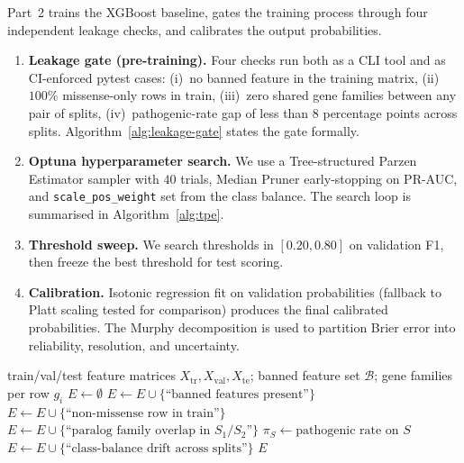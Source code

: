 \documentclass[11pt,a4paper,oneside]{report}
\begin{document}
Part~2 trains the XGBoost baseline, gates the training
process through four independent leakage checks, and
calibrates the output probabilities.

\begin{enumerate}
\item \textbf{Leakage gate (pre-training).} Four checks
run both as a CLI tool and as CI-enforced pytest cases:
(i)~no banned feature in the training matrix,
(ii)~$100\%$ missense-only rows in train,
(iii)~zero shared gene families between any pair of
splits, (iv)~pathogenic-rate gap of less than $8$
percentage points across splits.
Algorithm~\ref{alg:leakage-gate} states the gate
formally.
\item \textbf{Optuna hyperparameter search.} We use a
Tree-structured Parzen Estimator sampler
\citep{bergstra2011tpe} with $40$ trials, Median Pruner
early-stopping on PR-AUC, and \texttt{scale\_pos\_weight}
set from the class balance. The search loop is
summarised in Algorithm~\ref{alg:tpe}.
\item \textbf{Threshold sweep.} We search thresholds in
$[0.20, 0.80]$ on validation F1, then freeze the best
threshold for test scoring.
\item \textbf{Calibration.} Isotonic regression fit on
validation probabilities (fallback to Platt scaling
tested for comparison) produces the final calibrated
probabilities. The Murphy decomposition
\citep{murphy1973brier} is used to partition Brier
error into reliability, resolution, and uncertainty.
\end{enumerate}

\begin{algorithm}[htbp]
\caption{Four-invariant leakage gate}
\label{alg:leakage-gate}
\begin{algorithmic}[1]
\Require train/val/test feature matrices $X_{\text{tr}}, X_{\text{val}}, X_{\text{te}}$; banned feature set $\mathcal{B}$; gene families per row $g_i$
\State $E \gets \emptyset$ 
  \State $E \gets E \cup \{\text{``banned features present''}\}$
\EndIf
{}
  \State $E \gets E \cup \{\text{``non-missense row in train''}\}$
\EndIf
{}
    \State $E \gets E \cup \{\text{``paralog family overlap in } S_1/S_2\text{''}\}$
  \EndIf
\EndFor
{}
  \State $\pi_S \gets \text{pathogenic rate on } S$
\EndFor
{}
  \State $E \gets E \cup \{\text{``class-balance drift across splits''}\}$
\EndIf
\State \Return $E$ 
\end{algorithmic}
\end{algorithm}
\end{document}
